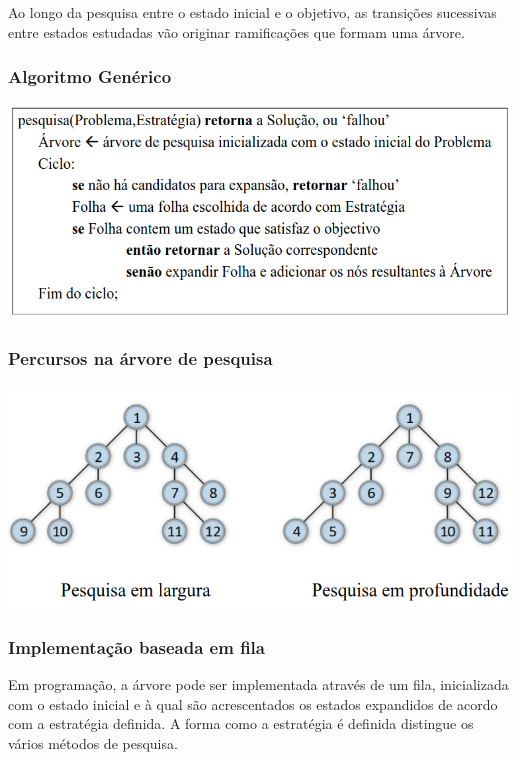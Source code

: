 \documentclass{article}
\begin{document}
Ao longo da pesquisa entre o estado inicial e o objetivo, as transições sucessivas entre estados
estudadas vão originar ramificações que formam uma árvore.

\subsubsection{Algoritmo Genérico}

\begin{center}
  \includegraphics[scale=0.35]{51}
\end{center}

\subsubsection{Percursos na árvore de pesquisa}

\begin{center}
  \includegraphics[scale=0.35]{52}
\end{center}

\subsubsection{Implementação baseada em fila}

Em programação, a árvore pode ser implementada através de um fila, inicializada com o estado
inicial e à qual são acrescentados os estados expandidos de acordo com a estratégia definida.
A forma como a estratégia é definida distingue os vários métodos de pesquisa.
\end{document}
